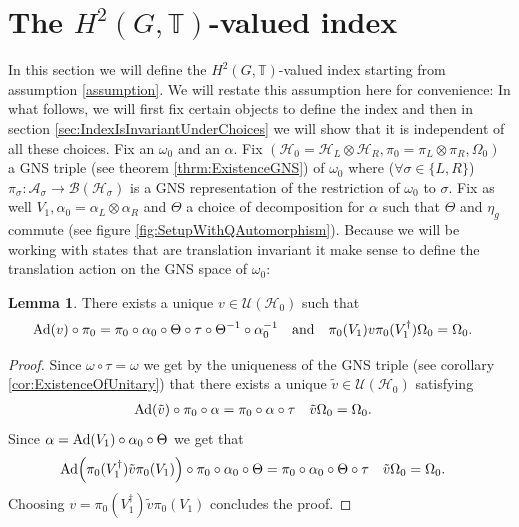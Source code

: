 \documentclass[12pt,a4paper,twoside]{article}
\let\originalleft\left
\let\originalright\right
\renewcommand{\left}{\mathopen{}\mathclose\bgroup\originalleft}
\renewcommand{\right}{\aftergroup\egroup\originalright}
\newcommand{\UU}{\mathcal U}
\newcommand{\BB}{\mathcal B}
\newcommand{\HH}{\mathcal H}
\newcommand{\TT}{\mathbb T}
\renewcommand{\AA}{\mathcal A}
\newcommand{\Ad}[1]{\textrm{Ad}\left(#1\right)}
\theoremstyle{definition}
\newtheorem{lemma}[theorem]{Lemma}
\numberwithin{equation}{section}
\begin{document}
\section{The $H^2(G,\TT)$-valued index}\label{sec:ProofFirstStatement}
In this section we will define the $H^2(G,\TT)$-valued index starting from assumption \ref{assumption}. We will restate this assumption here for convenience:
\assumptionOne*
In what follows, we will first fix certain objects to define the index and then in section \ref{sec:IndexIsInvariantUnderChoices} we will show that it is independent of all these choices. Fix an $\omega_0$ and an $\alpha$. Fix $(\HH_0=\HH_L\otimes\HH_R,\pi_0=\pi_L\otimes\pi_R,\Omega_0)$ a GNS triple (see theorem \ref{thrm:ExistenceGNS}) of $\omega_0$ where ($\forall\sigma\in\{L,R\}$) $\pi_\sigma:\AA_\sigma\rightarrow\BB(\HH_\sigma)$ is a GNS representation of the restriction of $\omega_0$ to $\sigma$. Fix as well $V_1,\alpha_0=\alpha_L\otimes\alpha_R$ and $\Theta$ a choice of decomposition for $\alpha$ such that $\Theta$ and $\eta_g$ commute (see figure \ref{fig:SetupWithQAutomorphism}). Because we will be working with states that are translation invariant it make sense to define the translation action on the GNS space of $\omega_0$:
\begin{lemma}\label{lem:Definition_v}
	There exists a unique $v\in\UU(\HH_0)$ such that
	\begin{align}
		\Ad{v}\circ\pi_0&=\pi_0\circ\alpha_0\circ\Theta\circ\tau\circ\Theta^{-1}\circ\alpha_0^{-1}&&\text{and}&\pi_0(V_1)v\pi_0(V_1^\dagger)\Omega_0&=\Omega_0.
	\end{align}
\end{lemma}
\begin{proof}
	Since $\omega\circ\tau=\omega$ we get by the uniqueness of the GNS triple (see corollary \ref{cor:ExistenceOfUnitary}) that there exists a unique $\tilde{v}\in\UU(\HH_0)$ satisfying
	\begin{align}
		\Ad{\tilde{v}}\circ\pi_0\circ\alpha&=\pi_0\circ\alpha\circ\tau&\tilde{v}\Omega_0&=\Omega_0.
	\end{align}
	Since $\alpha=\Ad{V_1}\circ\alpha_0\circ\Theta$ we get that
	\begin{align}
		\Ad{\pi_0(V_1^\dagger)\tilde{v}\pi_0(V_1)}\circ\pi_0\circ\alpha_0\circ\Theta&=\pi_0\circ\alpha_0\circ\Theta\circ\tau&\tilde{v}\Omega_0&=\Omega_0.
	\end{align}
	Choosing $v=\pi_0(V_1^\dagger)\tilde{v}\pi_0(V_1)$  concludes the proof.
\end{proof}
\end{document}
